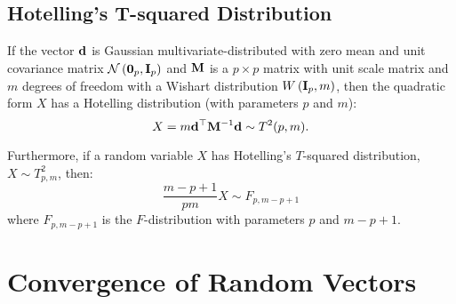 \subsection{Hotelling's T-squared Distribution}

\begin{definition}
	If the vector ${\bf d}$ is Gaussian multivariate-distributed with zero mean and unit covariance matrix ${\mathcal N}\left(\mathbf{0}_p,{\bf I}_{p}\right)$ and ${\bf M}$ is a $p\times p$ matrix with unit scale matrix and $m$ degrees of freedom with a Wishart distribution $W\left({\bf I}_{p},m\right)$, then the quadratic form $X$ has a Hotelling distribution (with parameters $p$ and $m$):
	\begin{equation*}
		X=m{\bf d}^{\top}{\bf M}^{-1}{\bf d}\sim T^2(p,m) .
	\end{equation*}

	Furthermore, if a random variable $X$ has Hotelling's $T$-squared distribution, $X \sim T_{p,m}^2$, then:
	\begin{equation*}
		\frac{m-p+1}{pm}X\sim F_{p,m-p+1}
	\end{equation*}
	where $F_{p,m-p+1}$ is the $F$-distribution with parameters $p$ and $m-p+1$.
\end{definition}

\section{Convergence of Random Vectors}

\begin{example}[Multinomial]

\end{example}
